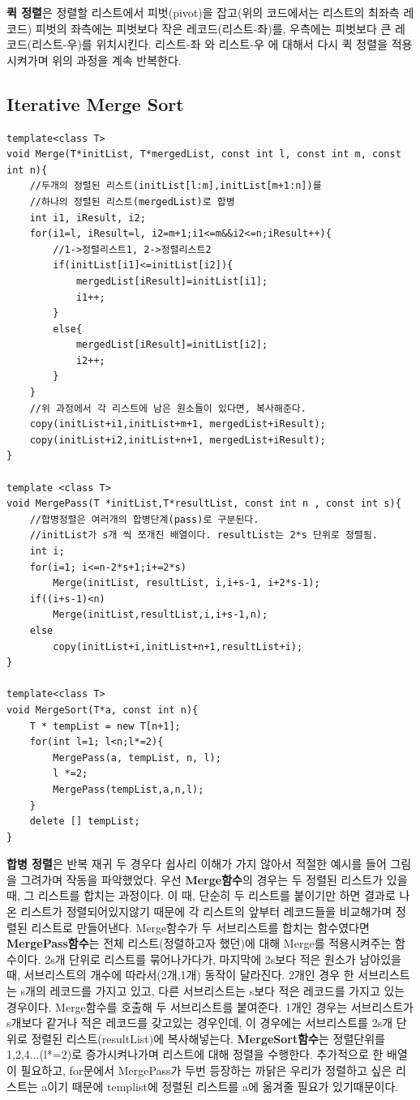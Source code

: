 \documentclass[a4paper,11pt]{article}
\begin{document}
\textbf{퀵 정렬}은 정렬할 리스트에서 피벗(pivot)을 잡고(위의 코드에서는 리스트의 최좌측 레코드) 피벗의 좌측에는 피벗보다 작은 레코드(리스트-좌)를, 우측에는 피벗보다 큰 레코드(리스트-우)를 위치시킨다. 리스트-좌 와 리스트-우 에 대해서 다시 퀵 정렬을 적용시켜가며 위의 과정을 계속 반복한다.  
\subsection{Iterative Merge Sort}
\begin{Verbatim}
template<class T>
void Merge(T*initList, T*mergedList, const int l, const int m, const int n){
    //두개의 정렬된 리스트(initList[l:m],initList[m+1:n])를 
    //하나의 정렬된 리스트(mergedList)로 합병
    int i1, iResult, i2;
    for(i1=l, iResult=l, i2=m+1;i1<=m&&i2<=n;iResult++){
        //1->정렬리스트1, 2->정렬리스트2
        if(initList[i1]<=initList[i2]){
            mergedList[iResult]=initList[i1];
            i1++;
        }
        else{
            mergedList[iResult]=initList[i2];
            i2++;
        }
    }
    //위 과정에서 각 리스트에 남은 원소들이 있다면, 복사해준다.
    copy(initList+i1,initList+m+1, mergedList+iResult);
    copy(initList+i2,initList+n+1, mergedList+iResult);
}

template <class T>
void MergePass(T *initList,T*resultList, const int n , const int s){
    //합병정렬은 여러개의 합병단계(pass)로 구분된다.
    //initList가 s개 씩 쪼개진 배열이다. resultList는 2*s 단위로 정렬됨.
    int i;
    for(i=1; i<=n-2*s+1;i+=2*s)
        Merge(initList, resultList, i,i+s-1, i+2*s-1);
    if((i+s-1)<n)
        Merge(initList,resultList,i,i+s-1,n);
    else
        copy(initList+i,initList+n+1,resultList+i);
}

template<class T>
void MergeSort(T*a, const int n){
    T * tempList = new T[n+1];
    for(int l=1; l<n;l*=2){
        MergePass(a, tempList, n, l);
        l *=2;
        MergePass(tempList,a,n,l);
    }
    delete [] tempList;
}
\end{Verbatim}

\textbf{합병 정렬}은 반복 재귀 두 경우다 쉽사리 이해가 가지 않아서 적절한 예시를 들어 그림을 그려가며 작동을 파악했었다. 우선 \textbf{Merge함수}의 경우는 두 정렬된 리스트가 있을 때, 그 리스트를 합치는 과정이다. 이 때, 단순히 두 리스트를 붙이기만 하면 결과로 나온 리스트가 정렬되어있지않기 때문에 각 리스트의 앞부터 레코드들을 비교해가며 정렬된 리스트로 만들어낸다. Merge함수가 두 서브리스트를 합치는 함수였다면 \textbf{MergePass함수}는 전체 리스트(정렬하고자 했던)에 대해 Merge를 적용시켜주는 함수이다. 2s개 단위로 리스트를 묶어나가다가, 마지막에 2s보다 적은 원소가 남아있을 때, 서브리스트의 개수에 따라서(2개,1개) 동작이 달라진다. 2개인 경우 한 서브리스트는 s개의 레코드를 가지고 있고, 다른 서브리스트는 s보다 적은 레코드를 가지고 있는 경우이다. Merge함수를 호출해 두 서브리스트를 붙여준다. 1개인 경우는 서브리스트가 s개보다 같거나 적은 레코드를 갖고있는 경우인데, 이 경우에는 서브리스트를 2s개 단위로 정렬된 리스트(resultList)에 복사해넣는다. \textbf{MergeSort함수}는 정렬단위를 1,2,4...(l*=2)로 증가시켜나가며 리스트에 대해 정렬을 수행한다. 추가적으로 한 배열이 필요하고, for문에서 MergePass가 두번 등장하는 까닭은 우리가 정렬하고 싶은 리스트는 a이기 때문에 templist에 정렬된 리스트를 a에 옮겨줄 필요가 있기때문이다.
\end{document}
